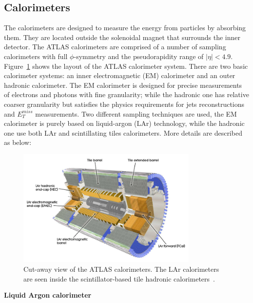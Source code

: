 \subsection{Calorimeters}

The calorimeters are designed to measure the energy from particles by absorbing them.
They are located outside the solenoidal magnet that surrounds the inner detector.
The ATLAS calorimeters are comprised of a number of sampling calorimeters with full $\phi$-symmetry and the pseudorapidity range of $|\eta|<4.9$.
Figure~\ref{fig:calo_dec} shows the layout of the ATLAS calorimeter system.
There are two basic calorimeter systems: an inner electromagnetic (EM) calorimeter and an outer hadronic calorimeter.
The EM calorimeter is designed for precise measurements of electrons and photons with fine granularity;
while the hadronic one has relative coarser granularity but satisfies the physics requirements for jets reconstructions and $E_{T}^{miss}$ measurements.
Two different sampling techniques are used, the EM calorimeter is purely based on liquid-argon (LAr) technology, while the hadronic one use both LAr and scintillating tiles calorimeters. 
More details are described as below:
\begin{figure}[!htb]
  \centering
  \includegraphics[width=0.8\textwidth]{figures/Detector/calo_layout.png}
  \caption{Cut-away view of the ATLAS calorimeters. The LAr calorimeters are seen inside the scintillator-based tile hadronic calorimeters~\cite{Buchanan:2008}.}
  \label{fig:calo_dec}
\end{figure}

\textbf{Liquid Argon calorimeter}

